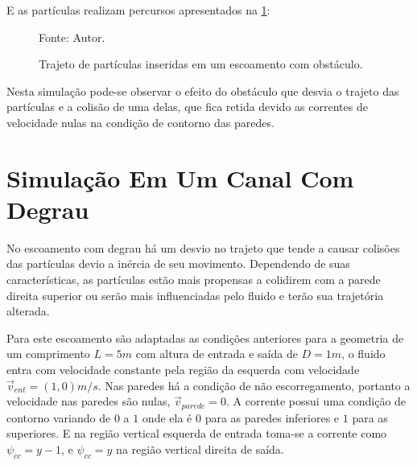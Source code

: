 E as partículas realizam percursos apresentados na \ref{obstacle_trajectory}:
\begin{figure}[H]
    \centering
     {\raggedleft \scriptsize Fonte: Autor.}
    \caption{Trajeto de partículas inseridas em um escoamento com obstáculo.}
    \label{obstacle_trajectory}
\end{figure}

Nesta simulação pode-se observar o efeito do obstáculo que desvia o trajeto das partículas e a colisão de uma delas, que fica retida devido as correntes de velocidade nulas na condição de contorno das paredes.

\section{\textbf{Simulação Em Um Canal Com Degrau}}
\label{sec_step}
No escoamento com degrau há um desvio no trajeto que tende a causar colisões das partículas devio a inércia de seu movimento.
Dependendo de suas características, as partículas estão mais propensas a colidirem com a parede direita superior ou serão mais influenciadas pelo fluido e terão sua trajetória alterada.

Para este escoamento são adaptadas as condições anteriores para a geometria de um comprimento $L=5m$ com altura de entrada e saída de $D=1m$, o fluido entra com velocidade constante pela região da esquerda com velocidade $\vec{v}_{ent}=(1, 0)m/s$.
Nas paredes há a condição de não escorregamento, portanto a velocidade nas paredes são nulas, $\vec{v}_{parede}=0$.
A corrente possui uma condição de contorno variando de $0$ a $1$ onde ela é $0$ para as paredes inferiores e $1$ para as superiores.
E na região vertical esquerda de entrada toma-se a corrente como $\psi_{cc}=y-1$, e $\psi_{cc}=y$ na região vertical direita de saída.

